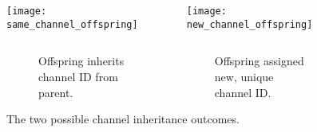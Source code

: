 \begin{figure}
\begin{columns}
  \begin{column}{0.5\textwidth}
    \colorbox{extralightgray}{\texttt{[image: same\_channel\_offspring]}}
  \end{column}%
  \begin{column}{0.5\textwidth}
    \colorbox{extralightgray}{\texttt{[image: new\_channel\_offspring]}}
  \end{column}%
\end{columns}%
\begin{columns}
  \begin{column}{0.5\textwidth}
    \begin{subfigure}[b]{\textwidth}
    \caption{Offspring inherits channel ID from parent.}
    \end{subfigure}
  \end{column}%
  \begin{column}{0.5\textwidth}
    \begin{subfigure}[b]{\textwidth}
    \caption{Offspring assigned new, unique channel ID.}
    \end{subfigure}
  \end{column}%
\end{columns}%
\caption{The two possible channel inheritance outcomes.}
\end{figure}
